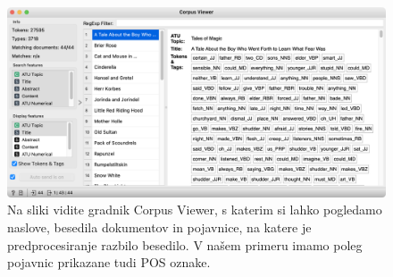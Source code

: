 \begin{figure}[h]
  \includegraphics[width=\linewidth]{corpus-viewer-pos.png}%
  \caption{Na sliki vidite gradnik Corpus Viewer, s katerim si lahko pogledamo naslove, besedila dokumentov in pojavnice, na katere je predprocesiranje razbilo besedilo. V našem primeru imamo poleg pojavnic prikazane tudi POS oznake.}
  \label{fig:002-corpus-viewer-pos}
\end{figure}

